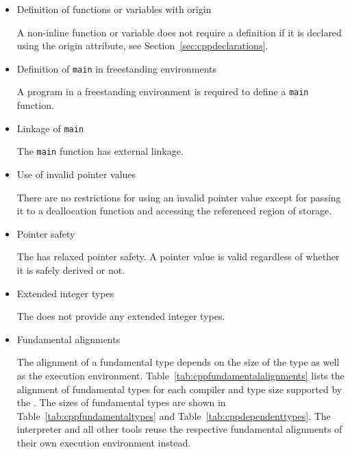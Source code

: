 
\begin{itemize}

\item Definition of functions or variables with origin 

A non-inline function or variable does not require a definition if it is declared using the origin attribute, see Section~\ref{sec:cppdeclarations}.

\item Definition of \texttt{main} in freestanding environments 

A program in a freestanding environment is required to define a \texttt{main} function.

\item Linkage of \texttt{main} 

The \texttt{main} function has external linkage.

\item Use of invalid pointer values 

There are no restrictions for using an invalid pointer value except for passing it to a deallocation function and accessing the referenced region of storage.

\item Pointer safety 

The \ecs{} has relaxed pointer safety.
A pointer value is valid regardless of whether it is safely derived or not.

\item Extended integer types 

The \ecs{} does not provide any extended integer types.

\item Fundamental alignments 

The alignment of a fundamental type depends on the size of the type as well as the execution environment.
Table~\ref{tab:cppfundamentalalignments} lists the alignment of fundamental types for each \cpp{} compiler and type size supported by the \ecs{}.
The sizes of fundamental types are shown in Table~\ref{tab:cppfundamentaltypes} and Table~\ref{tab:cppdependenttypes}.
The interpreter and all other tools reuse the respective fundamental alignments of their own execution environment instead.


\end{itemize}
